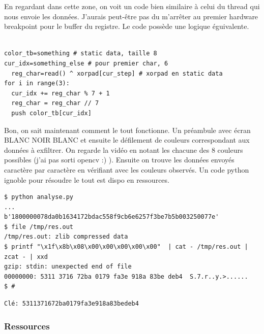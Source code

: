 \documentclass[14pt]{article}
\begin{document}
En regardant dans cette zone, on voit un code bien similaire à celui du thread qui nous envoie les données. J'aurais peut-être pas du m'arrêter au premier hardware breakpoint pour le buffer du registre.
Le code possède une logique éguivalente.

\begin{verbatim}

color_tb=something # static data, taille 8
cur_idx=something_else # pour premier char, 6
  reg_char=read() ^ xorpad[cur_step] # xorpad en static data
for i in range(3):
  cur_idx += reg_char % 7 + 1
  reg_char = reg_char // 7
  push color_tb[cur_idx]
\end{verbatim}

Bon, on sait maintenant comment le tout fonctionne. Un préambule avec écran BLANC NOIR BLANC et ensuite le défilement de couleurs correspondant aux données à exfiltrer.
On regarde la vidéo en notant les chacune des 8 couleurs possibles (j'ai pas sorti opencv :) ).
Ensuite on trouve les données envoyés caractère par caractère en vérifiant avec les couleurs observés.
Un code python ignoble pour résoudre le tout est dispo en ressources.

\begin{verbatim}
$ python analyse.py
...
b'1800000078da0b1634172bdac558f9cb6e6257f3be7b5b003250077e'
$ file /tmp/res.out
/tmp/res.out: zlib compressed data
$ printf "\x1f\x8b\x08\x00\x00\x00\x00\x00"  | cat - /tmp/res.out | zcat - | xxd
gzip: stdin: unexpected end of file
00000000: 5311 3716 72ba 0179 fa3e 918a 83be deb4  S.7.r..y.>......
$ #
\end{verbatim}

\begin{verbatim}
Clé: 5311371672ba0179fa3e918a83bedeb4
\end{verbatim}

\subsubsection{Ressources}
\end{document}
